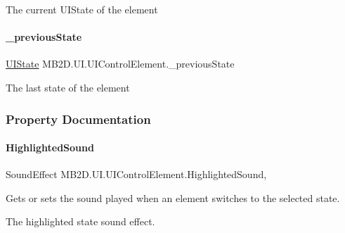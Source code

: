 The current U\+I\+State of the element 

\hypertarget{class_m_b2_d_1_1_u_i_1_1_u_i_control_element_a3a1c1743b02d8d2daa00231d5bb41067}{}\label{class_m_b2_d_1_1_u_i_1_1_u_i_control_element_a3a1c1743b02d8d2daa00231d5bb41067} 
\paragraph{\texorpdfstring{\+\_\+previous\+State}{\_previousState}}
{\footnotesize\ttfamily \hyperlink{namespace_m_b2_d_1_1_u_i_a3d5fed7e80959a1444165894dfd9e75b}{U\+I\+State} M\+B2\+D.\+U\+I.\+U\+I\+Control\+Element.\+\_\+previous\+State\hspace{0.3cm}{\ttfamily [protected]}}



The last state of the element 



\subsubsection{Property Documentation}
\hypertarget{class_m_b2_d_1_1_u_i_1_1_u_i_control_element_abc0d689a5a22fe884d243f25141df360}{}\label{class_m_b2_d_1_1_u_i_1_1_u_i_control_element_abc0d689a5a22fe884d243f25141df360} 
\paragraph{\texorpdfstring{Highlighted\+Sound}{HighlightedSound}}
{\footnotesize\ttfamily Sound\+Effect M\+B2\+D.\+U\+I.\+U\+I\+Control\+Element.\+Highlighted\+Sound\hspace{0.3cm}{\ttfamily [get]}, {\ttfamily [set]}}



Gets or sets the sound played when an element switches to the selected state. 

The highlighted state sound effect.\hypertarget{class_m_b2_d_1_1_u_i_1_1_u_i_control_element_aab215aee6dcf8827149dbfcb3721db89}{}\label{class_m_b2_d_1_1_u_i_1_1_u_i_control_element_aab215aee6dcf8827149dbfcb3721db89} 
